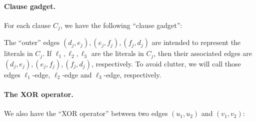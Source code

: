 \documentclass[11pt, a4paper]{article}
\begin{document}
\paragraph*{Clause gadget.}
For each clause $C_j$, we have the following ``clause gadget'':
\begin{center}
\end{center}
The ``outer'' edges $(d_{j},e_{j}),(e_{j},f_{j}),(f_{j},d_{j})$ are intended to represent the literals in $C_j$.
If $\ell_1,\ell_2,\ell_3$ are the literals in $C_j$,
then their associated edges are $(d_{j},e_{j}),(e_{j},f_{j}),(f_{j},d_{j})$, respectively.
To avoid clutter, we will call those edges $\ell_1$-edge, $\ell_2$-edge and $\ell_3$-edge, respectively.


\paragraph*{The XOR operator.}
We also have the ``XOR operator'' between two edges $(u_1,u_2)$ and $(v_1,v_2)$:
\end{document}
